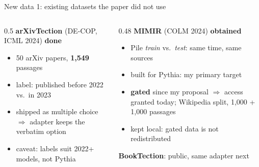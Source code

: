 \documentclass[aspectratio=169,10pt]{beamer}
\newcommand{\muted}[1]{{\color{ink2}#1}}
\begin{document}
\begin{frame}{New data 1: existing datasets the paper did not use}
  \begin{columns}[T]
    \begin{column}{0.5\textwidth}
      \textbf{arXivTection} \muted{(DE-COP, ICML 2024)} \hfill\textcolor{saqua}{\textbf{done}}
      \begin{itemize}\setlength\itemsep{2pt}
        \item 50 arXiv papers, \textbf{1,549} passages
        \item label: published before 2022 vs.\ in 2023
        \item shipped as multiple choice $\Rightarrow$ adapter keeps the verbatim option
        \item \muted{caveat: labels suit 2022+ models, not Pythia}
      \end{itemize}
    \end{column}
    \begin{column}{0.48\textwidth}
      \textbf{MIMIR} \muted{(COLM 2024)} \hfill\textcolor{saqua}{\textbf{obtained}}
      \begin{itemize}\setlength\itemsep{2pt}
        \item Pile \emph{train} vs.\ \emph{test}: same time, same sources
        \item built for Pythia: my primary target
        \item \textbf{gated} since my proposal $\Rightarrow$ access granted today;
              Wikipedia split, 1,000 + 1,000 passages
        \item \muted{kept local: gated data is not redistributed}
      \end{itemize}
      \vspace{0.3em}
      \textbf{BookTection}: public, same adapter \hfill\muted{next}
    \end{column}
  \end{columns}
\end{frame}
\end{document}
